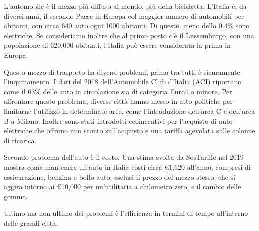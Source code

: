 L'automobile è il mezzo più diffuso al mondo, più della bicicletta. L'Italia è, da diversi anni, il secondo Paese in Europa col maggior numero di automobili per abitanti, con circa 640 auto ogni 1000 abitanti. Di queste, meno dello 0.4\% sono elettriche. Se consideriamo inoltre che al primo posto c'è il Lussemburgo, con una popolazione di 620,000 abitanti, l'Italia può essere considerata la prima in Europa.

Questo mezzo di trasporto ha diversi problemi, primo tra tutti è sicuramente l'inquinamento. I dati del 2018 dell'Automobile Club d'Italia (ACI) riportano come il 63\% delle auto in circolazione sia di categoria Euro4 o minore. Per affrontare questo problema, diverse città hanno messo in atto politiche per limitarne l'utilizzo in determinate aree, come l'introduzione dell'area C e dell'area B a Milano. Inoltre sono stati introdotti ecoincentivi per l'acquisto di auto elettriche che offrono uno sconto sull'acquisto e una tariffa agevolata sulle colonne di ricarica.

Secondo problema dell'auto è il costo. Una stima svolta da SosTariffe nel 2019 mostra come mantenere un'auto in Italia costi circa €1,620 all'anno, compresi di assicurazione, benzina e bollo auto, esclusi il prezzo del mezzo stesso, che si aggira intorno ai €10,000 per un'utilitaria a chilometro zero, e il cambio delle gomme.

Ultimo ma non ultimo dei problemi è l'efficienza in termini di tempo all'interno delle grandi città. 
